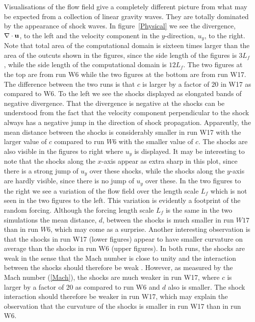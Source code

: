 Visualisations of the flow field give a completely different picture from what
may be expected from a collection of linear gravity waves. They are totally
dominated by the appearance of shock waves. In figure~\ref{Physical} we see
the divergence, $ \nabla \cdot {\bf u} $, to the left and the velocity
component in the $ y $-direction, $ u_y $, to the right.  Note that total area of the computational domain is sixteen times larger than the area of the outcuts shown in the figures, since the side length of the figures is $ 3 L_f $, while the side length of the computational domain is $ 12 L_f $.
The two figures at the
top are from run W6 while the two figures at the bottom are from run W17. The
difference between the two runs is that $ c $ is larger by a factor of $ 20 $
in W17 as compared to W6. To the left we see the shocks displayed as elongated
bands of negative divergence. That the divergence is negative at the shocks can
be understood from the fact that the velocity component perpendicular to the
shock always has a negative jump in the direction of shock propagation.
Apparently, the mean distance between the shocks is considerably smaller in run
W17 with the larger value of $ c $ compared to run $ W6 $ with the smaller
value of $ c $. 
The shocks are also visible in the figures to right where $ u_y
$ is displayed. It may be interesting to note that the shocks along the $ x
$-axis appear as extra sharp in this plot, since there is a strong jump of $
u_{y} $ over these shocks, while the shocks along the $ y $-axis are hardly
visible, since there is no jump of $ u_{y} $ over these. In the two figures to
the right we see a variation of the flow field over the length scale $ L_f $
which is not seen in the two figures to the left. This variation is evidently a
footprint of the random forcing. Although the forcing length scale $ L_f $ is
the same in the two simulations the mean distance, $ d $, between the shocks is
much smaller in run $ W17 $ than in run $ W6 $, which may come as a surprise. Another interesting observation is that the shocks in run W17 (lower figures) appear to have smaller curvature on average than the shocks in run W6 (upper figures). In both runs, the shocks are weak in the sense that the Mach number is close to unity and the interaction between the shocks should therefore be weak \cite[see][]{ApazidisEliasson2018}. However, as measured by the Mach number  (\ref{Mach}), the shocks are much weaker in run W17, where $ c $ is larger by a factor of 20 as compared to run W6 and $ d $ also is smaller. The shock interaction should therefore be weaker in run W17, which may explain the observation that the curvature of the shocks is smaller in run W17 than in run W6.
